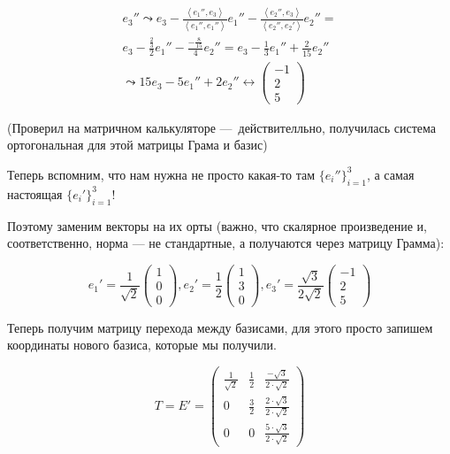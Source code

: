 \documentclass[12pt, a4paper]{article}
\begin{document}
    
    \begin{multline}
        e_3'' \leadsto e_3 - \frac{\left\langle e_1'', e_3 \right\rangle}
        {\left\langle e_1'', e_1'' \right\rangle} e_1''
        - \frac{\left\langle e_2'', e_3 \right\rangle}
        {\left\langle e_2'', e_2' \right\rangle} e_2'' = \\
        e_3 - \frac{\frac 23}{2} e_1''
        - \frac{-\frac 8 {15}}{4} e_2'' = e_3 - \frac 13 e_1''
        + \frac 2 {15} e_2'' \\
        \leadsto 15 e_3 - 5 e_1'' + 2 e_2'' \leftrightarrow \begin{pmatrix}
            -1 \\ 2 \\ 5
        \end{pmatrix}
    \end{multline}
    
    (Проверил на матричном калькуляторе — действителльно, 
    получилась система ортогональная для этой матрицы Грама и базис)

    Теперь вспомним, что нам нужна не просто 
    какая-то там $\{e_i''\}_{i = 1}^3$, а самая настоящая $\{e_i'\}_{i = 1}^3$!

    Поэтому заменим векторы на их орты 
    (важно, что скалярное произведение и, соответственно, норма 
    — не стандартные, а получаются через матрицу Грамма):

    \begin{equation}
        e_1' = \frac {1}{\sqrt{2}} \begin{pmatrix}
            1 \\ 0 \\ 0
        \end{pmatrix},
        e_2' = \frac{1}{2} \begin{pmatrix}
            1 \\ 3 \\ 0
        \end{pmatrix},
        e_3' = \frac{\sqrt{3}}{2\sqrt{2}} \begin{pmatrix}
            -1 \\ 2 \\ 5
        \end{pmatrix}
    \end{equation}

    Теперь получим матрицу перехода между базисами, 
    для этого просто запишем координаты нового базиса, которые мы получили.

    \begin{equation}
        T = E' = \left(\begin{matrix}
            \frac{1}{\sqrt{2}} & \frac{1}{2} & \frac{-\sqrt{3}}{2 \cdot \sqrt{2}} \\
            0 & \frac{3}{2} & \frac{2 \cdot \sqrt{3}}{2 \cdot \sqrt{2}} \\
            0 & 0 & \frac{5 \cdot \sqrt{3}}{2 \cdot \sqrt{2}}
        \end{matrix}\right)
    \end{equation}
\end{document}
